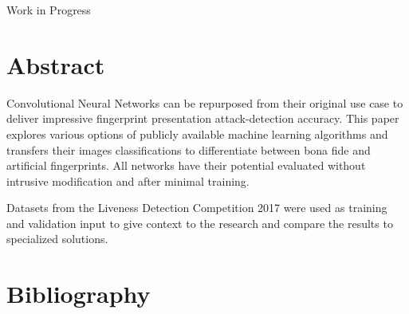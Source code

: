 \maketitle
\begin{center}
\huge Work in Progress
\end{center}
\section{Abstract}
Convolutional Neural Networks can be repurposed from their original use case to deliver impressive fingerprint presentation attack-detection accuracy.
This paper explores various options of publicly available machine learning algorithms and transfers their images classifications to differentiate between bona fide and artificial fingerprints.
All networks have their potential evaluated without intrusive modification and after minimal training.

\medskip\noindent
Datasets from the Liveness Detection Competition 2017 were used as training and validation input to give context to the research and compare the results to specialized solutions.








\section{Bibliography}